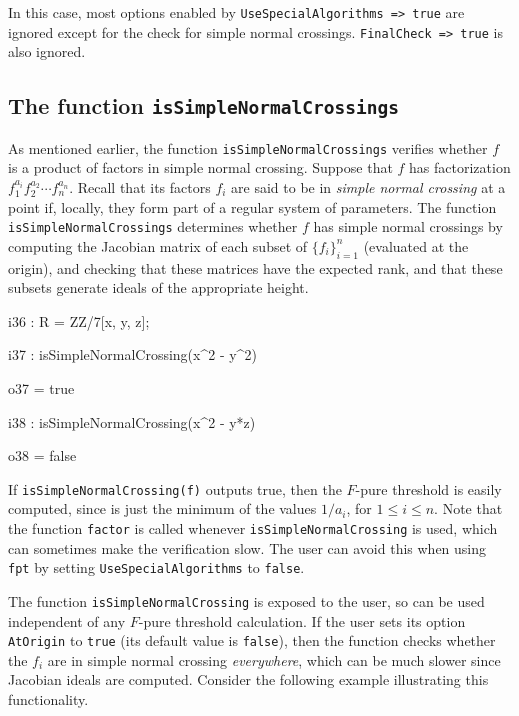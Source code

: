 \documentclass{amsart}
\begin{document}
\noindent In this case, most options enabled by \texttt{UseSpecialAlgorithms => true}
are ignored except for the check for simple normal crossings.  \texttt{FinalCheck => true}
is also ignored.

\subsection{The function \texttt{isSimpleNormalCrossings}} \label{subsec.SNC}
As mentioned earlier, the function \texttt{isSimpleNormalCrossings} verifies whether $f$ is a product of factors in simple normal crossing.
Suppose that $f$ has factorization $f_1^{a_i} f_2^{a_2} \cdots f_n^{a_n}$.  Recall that its factors $f_i$ are said to be in
\emph{simple normal crossing} at a point if, locally, they form part of a regular system of parameters.  The function \texttt{isSimpleNormalCrossings} determines whether $f$ has simple normal crossings by computing the Jacobian matrix of each subset of $\{ f_i \}_{i=1}^n$ (evaluated at the origin), and checking that these matrices have the expected rank, and that these subsets generate ideals of the appropriate height.

\bigskip
{\small
{}
\begin{MyVerbatim}
i36 : R = ZZ/7[x, y, z];

i37 : isSimpleNormalCrossing(x^2 - y^2)

o37 = true

i38 : isSimpleNormalCrossing(x^2 - y*z)

o38 = false
\end{MyVerbatim}
}
\bigskip


If \texttt{isSimpleNormalCrossing(f)} outputs true, then the $F$-pure threshold is easily computed, since is just the minimum of the values $1/a_i$, for $1 \leq i \leq n$.
Note that the function \texttt{factor} is called whenever \texttt{isSimpleNormalCrossing} is used, which can sometimes make the verification slow.  The user can avoid this when using \texttt{fpt} by setting \texttt{UseSpecialAlgorithms} to \texttt{false}.

The function \texttt{isSimpleNormalCrossing} is exposed to the user, so can be used independent of any $F$-pure threshold calculation.
If the user sets its option \texttt{AtOrigin} to \texttt{true} (its default value is \texttt{false}), then the function checks whether the $f_i$ are in simple normal crossing \emph{everywhere}, which can be much slower since Jacobian ideals are computed. Consider the following example illustrating this functionality.
\end{document}
